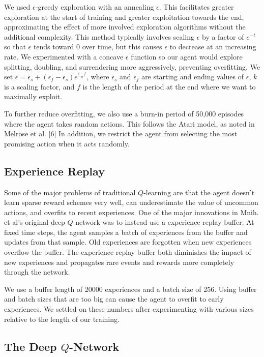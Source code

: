 \documentclass{article}
\begin{document}
We used $\epsilon$-greedy exploration with an annealing $\epsilon$. This facilitates greater exploration at the start of training and greater exploitation towards the end, approximating the effect of more involved exploration algorithms without the additional complexity. This method typically involves scaling $\epsilon$ by a factor of $e^{-t}$ so that $\epsilon$ tends toward $0$ over time, but this causes $\epsilon$ to decrease at an increasing rate. We experimented with a concave $\epsilon$ function so our agent would explore splitting, doubling, and surrendering more aggressively, preventing overfitting. We set $\epsilon = \epsilon_s + (\epsilon_f - \epsilon_s)e^{\frac{t - f}{k}}$, where $\epsilon_s$ and $\epsilon_f$ are starting and ending values of $\epsilon$, $k$ is a scaling factor, and $f$ is the length of the period at the end where we want to maximally exploit. 

To further reduce overfitting, we also use a burn-in period of 50,000 episodes where the agent takes random actions. This follows the Atari model, as noted in Melrose et al. [6] In addition, we restrict the agent from selecting the most promising action when it acts randomly. 

\subsection{Experience Replay}

Some of the major problems of traditional $Q$-learning are that the agent doesn't learn sparse reward schemes very well, can underestimate the value of uncommon actions, and overfits to recent experiences. One of the major innovations in Mnih. et al's original deep $Q$-network was to instead use a experience replay buffer. At fixed time steps, the agent samples a batch of experiences from the buffer and updates from that sample. Old experiences are forgotten when new experiences overflow the buffer. The experience replay buffer both diminishes the impact of new experiences and propagates rare events and rewards more completely through the network. 

We use a buffer length of 20000 experiences and a batch size of 256. Using buffer and batch sizes that are too big can cause the agent to overfit to early experiences. We settled on these numbers after experimenting with various sizes relative to the length of our training. 

\subsection{The Deep $Q$-Network}
\end{document}
